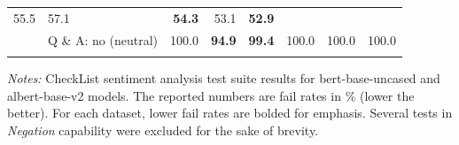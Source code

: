 \documentclass{article}
\begin{document}
\begin{table}[!htbp]
\begin{threeparttable}[b]
\begin{tabular}{llrrrrrr}
  55.5 &
  57.1 &
  \textbf{54.3} &
  53.1 &
  \textbf{52.9} \\
 &
  Q \& A: no (neutral) &
  100.0 &
  \textbf{94.9} &
  \textbf{99.4} &
  100.0 &
  100.0 &
  100.0 \\
 &
   &
   &
   &
   &
   &
  \multicolumn{1}{l}{} &
  \multicolumn{1}{l}{}
\end{tabular}
\begin{tablenotes}[flushleft]
\footnotesize 
\item \textit{Notes:} CheckList sentiment analysis test suite results for bert-base-uncased and albert-base-v2 models. The reported numbers are fail rates in \% (lower the better). For each dataset, lower fail rates are bolded for emphasis. Several tests in \emph{Negation} capability were excluded for the sake of brevity.
\end{tablenotes}
\end{threeparttable}
\label{checklist-testing-results}
\end{table}

\clearpage
\end{document}

